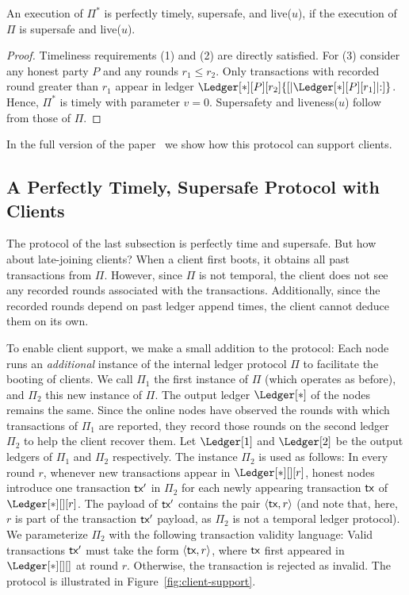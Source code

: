 \begin{theorem} \label{thm:backward-reduction}
  An execution of $\Pi^*$ is perfectly timely, supersafe, and live($u$), if the execution of
  $\Pi$ is supersafe and live($u$).
\end{theorem}
\begin{proof}
  Timeliness requirements (1) and (2) are directly satisfied.
  For (3) consider any honest party $P$ and any rounds $r_1 \leq r_2$.
  Only transactions with recorded round greater
  than $r_1$ appear in ledger $\Ledger[*][P][r_2]{[|\Ledger[*][P][r_1]|{:}]}$.
  Hence, $\Pi^*$ is timely with parameter $v = 0$.
  Supersafety and liveness($u$) follow from those of $\Pi$.
  \Qed
\end{proof}

In the full version of the paper~\cite{timeliness} we show how this protocol can support clients.

\ifproceedings
  \subsection{A Perfectly Timely, Supersafe Protocol with Clients}

  The protocol of the last subsection is perfectly time and supersafe.
  But how about late-joining clients?
  When a client first boots, it obtains all past transactions
  from $\Pi$.
  However, since $\Pi$ is not temporal, the client does not see any recorded rounds
  associated with the transactions. Additionally, since the recorded rounds depend
  on past ledger append times, the client cannot deduce them on its own.

  To enable client support, we make a small addition to the protocol:
  Each node runs an \emph{additional} instance of the internal
  ledger protocol $\Pi$
  to facilitate the booting of clients.
  We call $\Pi_1$ the first instance of $\Pi$
  (which operates as before),
  and $\Pi_2$ this new instance of $\Pi$.
  The output ledger $\Ledger[*]$ of the nodes remains the same.
  Since the online nodes have observed the rounds with which
  transactions of $\Pi_1$ are reported, they record those
  rounds on the second ledger $\Pi_2$ to help the client
  recover them.
  Let $\Ledger[1]$ and $\Ledger[2]$ be the output ledgers
  of $\Pi_1$ and $\Pi_2$ respectively.
  The instance $\Pi_2$ is used as follows:
  In every round $r$,
  whenever new transactions appear in $\Ledger[*][][r]$,
  honest nodes introduce one transaction $\textsf{tx}'$ in $\Pi_2$
  for each newly appearing transaction $\textsf{tx}$ of $\Ledger[*][][r]$.
  The payload of $\textsf{tx}'$ contains the pair $\left<\textsf{tx}, r\right>$
  (and note that, here, $r$ is part of the transaction $\textsf{tx}'$ payload,
  as $\Pi_2$ is not a temporal ledger protocol).
  We parameterize $\Pi_2$ with the following transaction validity language:
  Valid transactions $\textsf{tx}'$ must take the form $\left<\textsf{tx}, r\right>$,
  where $\textsf{tx}$ first appeared in $\Ledger[*][][]$ at round $r$.
  Otherwise, the transaction is rejected as invalid.
  The protocol is illustrated in Figure~\ref{fig:client-support}.


